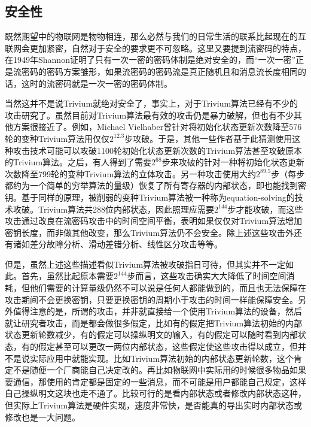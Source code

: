 \subsection{安全性}

既然期望中的物联网是物物相连，那么必然与我们的日常生活的联系比起现在的互联网会更加紧密，自然对于安全的要求更不可忽略。这里又要提到流密码的特点，在1949年Shannon证明了只有一次一密的密码体制是绝对安全的\supercite{shannon1949communication}，而“一次一密”正是流密码的密码方案雏形，如果流密码的密码流是真正随机且和消息流长度相同的话，这时的流密码就是一次一密的密码体制。

当然这并不是说Trivium就绝对安全了，事实上，对于Trivium算法已经有不少的攻击研究了。虽然目前对Trivium算法最有效的攻击仍是暴力破解，但也有不少其他方案很接近了。例如，Michael Vielhaber曾针对将初始化状态更新次数降至576轮的变种Trivium算法用仅仅$2^{12.3}$步攻破\supercite{cryptoeprint:2007:413}。于是，其他一些作者基于此猜测使用这种攻击技术可能可以攻破1100轮初始化状态更新次数的Trivium算法甚至攻破原本的Trivium算法\supercite{cryptoeprint:2008:385}。之后，有人得到了需要$2^{68}$步来攻破的针对一种将初始化状态更新次数降至799轮的变种Trivium算法的立体攻击\supercite{cryptoeprint:2015:312}。另一种攻击使用大约$2^{89.5}$步（每步都约为一个简单的穷举算法的量级）恢复了所有寄存器的内部状态，即也能找到密钥\supercite{cryptoeprint:2007:021}。基于同样的原理，被削弱的变种Trivium算法被一种称为equation-solving的技术攻破\supercite{raddum2006cryptanalytic}。Trivium算法共288位内部状态，因此照理应需要$2^{144}$步才能攻破，而这些攻击通过改良在流密码攻击中的时间空间平衡，表明如果仅仅对Trivium算法增加密钥长度，而非做其他改变，那么Trivium算法仍不会安全。除上述这些攻击外还有诸如差分故障分析\supercite{hojsik2008differential}、滑动差错分析\supercite{hojsik2008floating}、线性区分攻击\supercite{maximov2007two}等等。

但是，虽然上述这些描述看似Trivium算法被攻破指日可待，但其实并不一定如此。首先，虽然比起原本需要$2^{144}$步而言，这些攻击确实大大降低了时间空间消耗，但他们需要的计算量级仍然不可以说是任何人都能做到的，而且也无法保障在攻击期间不会更换密钥，只要更换密钥的周期小于攻击的时间一样能保障安全。另外值得注意的是，所谓的攻击，并非就直接给一个使用Trivium算法的设备，然后就让研究者攻击，而是都会做很多假定，比如有的假定把Trivium算法初始的内部状态更新轮数减少，有的假定可以操纵明文的输入，有的假定可以随时看到内部状态，有的假定甚至可以更改一两位内部状态，这些假定使这些攻击得以成立，但并不是说实际应用中就能实现。比如Trivium算法初始的内部状态更新轮数，这个肯定不是随便一个厂商能自己决定改的。再比如物联网中实际用的时候很多物品如果要通信，那使用的肯定都是固定的一些消息，而不可能是用户都能自己规定，这样自己操纵明文这块也走不通了。比较可行的是看内部状态或者修改内部状态这种，但实际上Trivium算法是硬件实现，速度非常快，是否能真的导出实时内部状态或修改也是一大问题。

